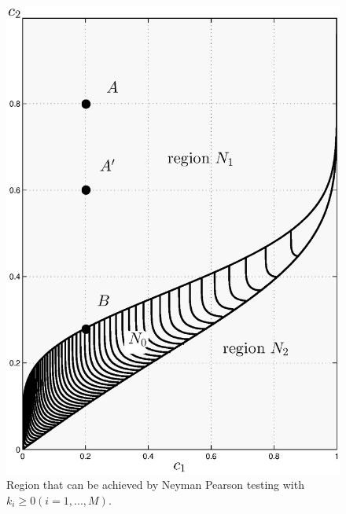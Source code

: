 \documentclass[12pt,journal,a4paper,twoside,onecolumn]{IEEEtran}
\begin{document}
\begin{spacing}{2.5}
\begin{figure}[!t]
\includegraphics[width=12cm]{singlecontour.eps}
\caption{Region that can be achieved by Neyman Pearson testing with $k_i \geq 0 (i=1, ..., M)$.}
\label{pic: contour for m0 gaussian}
\end{figure}


\end{spacing}
\end{document}
